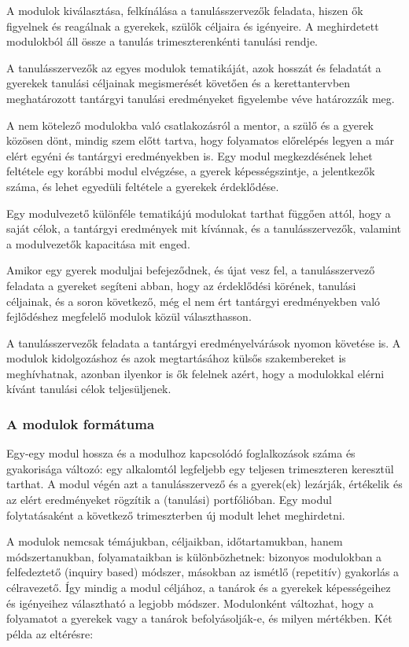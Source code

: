A modulok kiválasztása, felkínálása a tanulásszervezők feladata, hiszen ők figyelnek és reagálnak a gyerekek, szülők céljaira és igényeire. A meghirdetett modulokból áll össze a tanulás trimeszterenkénti tanulási rendje.

A tanulásszervezők az egyes modulok tematikáját, azok hosszát és feladatát a gyerekek tanulási céljainak megismerését követően és a kerettantervben meghatározott tantárgyi tanulási eredményeket figyelembe véve határozzák meg.

A nem kötelező modulokba való csatlakozásról a mentor, a szülő és a gyerek közösen dönt, mindig szem előtt tartva, hogy folyamatos előrelépés legyen a már elért egyéni és tantárgyi eredményekben is. Egy modul megkezdésének lehet feltétele egy korábbi modul elvégzése, a gyerek képességszintje, a jelentkezők száma, és lehet egyedüli feltétele a gyerekek érdeklődése.

Egy modulvezető különféle tematikájú modulokat tarthat függően attól, hogy a saját célok, a tantárgyi eredmények mit kívánnak, és a tanulásszervezők, valamint a modulvezetők kapacitása mit enged.

Amikor egy gyerek moduljai befejeződnek, és újat vesz fel, a tanulásszervező feladata a gyereket segíteni abban, hogy az érdeklődési körének, tanulási céljainak, és a soron következő, még el nem ért tantárgyi eredményekben való fejlődéshez megfelelő modulok közül választhasson.

A tanulásszervezők feladata a tantárgyi eredményelvárások nyomon követése is. A modulok kidolgozáshoz és azok megtartásához külsős szakembereket is meghívhatnak, azonban ilyenkor is ők felelnek azért, hogy a modulokkal elérni kívánt tanulási célok teljesüljenek.

\subsubsection{A modulok formátuma}

Egy-egy modul hossza és a modulhoz kapcsolódó foglalkozások száma és gyakorisága változó: egy alkalomtól legfeljebb egy teljesen trimeszteren keresztül tarthat. A modul végén azt a tanulásszervező és a gyerek(ek) lezárják, értékelik és az elért eredményeket rögzítik a (tanulási) portfólióban. Egy modul folytatásaként a következő trimeszterben új modult lehet meghirdetni.

A modulok nemcsak témájukban, céljaikban, időtartamukban, hanem módszertanukban, folyamataikban is különbözhetnek: bizonyos modulokban a felfedeztető (inquiry based) módszer, másokban az ismétlő (repetitív) gyakorlás a célravezető. Így mindig a modul céljához, a tanárok és a gyerekek képességeihez és igényeihez választható a legjobb módszer. Modulonként változhat, hogy a folyamatot a gyerekek vagy a tanárok befolyásolják-e, és milyen mértékben. Két példa az eltérésre:

